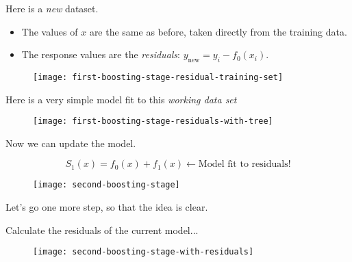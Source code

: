 \begin{frame}
Here is a \textit{new} dataset.

\begin{itemize}
  \item The values of $x$ are the same as before, taken directly from the training data.
  \item The response values are the \textit{residuals}: $y_{\text{new}} = y_i - f_0(x_i)$.
\end{itemize}

  \begin{figure}
    \texttt{[image: first-boosting-stage-residual-training-set]}
  \end{figure}
  
\end{frame}
%

\begin{frame}
Here is a very simple model fit to this \textit{working data set}

  \begin{figure}
    \texttt{[image: first-boosting-stage-residuals-with-tree]}
  \end{figure}

\end{frame}
%

\begin{frame}
Now we can update the model.

$$S_1(x) = f_0(x) + f_1(x) \leftarrow \text{Model fit to residuals!}$$

  \begin{figure}
    \texttt{[image: second-boosting-stage]}
  \end{figure}
  
\end{frame}
%

\begin{frame}
  \begin{center}
    Let's go one more step, so that the idea is clear.
  \end{center}
\end{frame}
%

\begin{frame}
Calculate the residuals of the current model...

  \begin{figure}
    \texttt{[image: second-boosting-stage-with-residuals]}
  \end{figure}
  
\end{frame}
%

